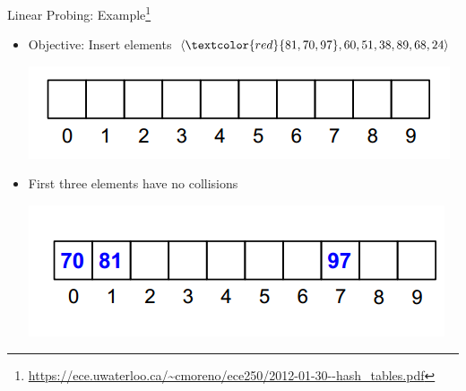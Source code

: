 \documentclass{beamer}
\begin{document}
\begin{frame}{Linear Probing: Example\footnote{\url{https://ece.uwaterloo.ca/~cmoreno/ece250/2012-01-30--hash_tables.pdf}}}
    \begin{itemize}
        \item Objective: Insert elements $\langle \textcolor{red}{81, 70, 97}, 60, 51, 38, 89, 68, 24 \rangle$ 
        \begin{center}
            \includegraphics[scale=0.5]{linearProbing1.png}
        \end{center}
        \item First three elements have no collisions \pause
        \begin{center}
            \includegraphics[scale=0.5]{linearProbing2.png}
        \end{center}
    \end{itemize}
\end{frame}
\end{document}
